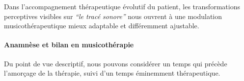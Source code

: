 



Dans l'accompagnement thérapeutique évolutif du patient,
 les transformations perceptives visibles sur
\textit{``le tracé sonore''} nous ouvrent à une modulation
musicothérapeutique mieux adaptable et différemment ajustable.



\paragraph{\textbf{Anamnèse et bilan en musicothérapie}}
Du point de vue descriptif, nous pouvons considérer un temps qui
précède
l'amorçage de la thérapie, suivi d'un temps éminemment thérapeutique.


